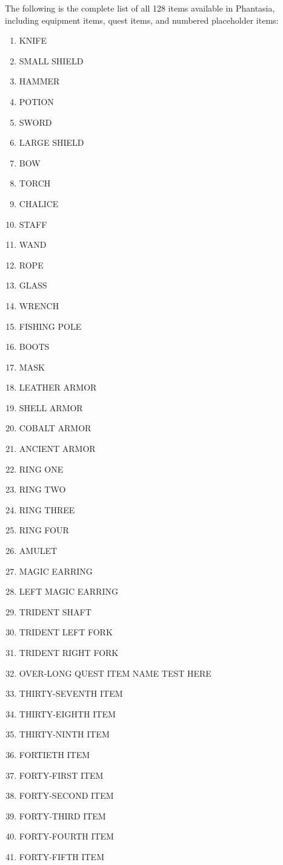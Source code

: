 \documentclass[11pt,letterpaper,oldstylefigures]{memoir}
\newcommand{\Phantasia}{{\irishfont Phantasia}}
\begin{document}
The following is the complete list of all 128 items available in \Phantasia{}, including equipment items, quest items, and numbered placeholder items:

\begin{enumerate}
\item KNIFE
\item SMALL SHIELD
\item HAMMER
\item POTION
\item SWORD
\item LARGE SHIELD
\item BOW
\item TORCH
\item CHALICE
\item STAFF
\item WAND
\item ROPE
\item GLASS
\item WRENCH
\item FISHING POLE
\item BOOTS
\item MASK
\item LEATHER ARMOR
\item SHELL ARMOR
\item COBALT ARMOR
\item ANCIENT ARMOR
\item RING ONE
\item RING TWO
\item RING THREE
\item RING FOUR
\item AMULET
\item MAGIC EARRING
\item LEFT MAGIC EARRING
\item TRIDENT SHAFT
\item TRIDENT LEFT FORK
\item TRIDENT RIGHT FORK
\item OVER-LONG QUEST ITEM NAME TEST HERE
\item THIRTY-SEVENTH ITEM
\item THIRTY-EIGHTH ITEM
\item THIRTY-NINTH ITEM
\item FORTIETH ITEM
\item FORTY-FIRST ITEM
\item FORTY-SECOND ITEM
\item FORTY-THIRD ITEM
\item FORTY-FOURTH ITEM
\item FORTY-FIFTH ITEM

\end{enumerate}
\end{document}
